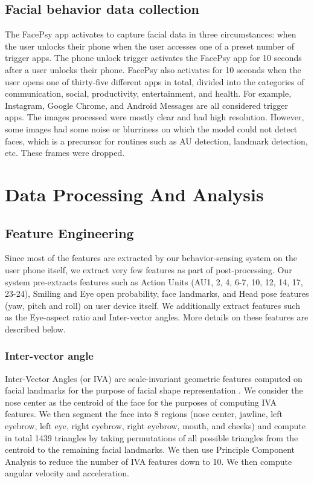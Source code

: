\subsection{Facial behavior data collection}
The FacePsy app activates to capture facial data in three circumstances: when the user unlocks their phone when the user accesses one of a preset number of trigger apps. The phone unlock trigger activates the FacePsy app for 10 seconds after a user unlocks their phone. FacePsy also activates for 10 seconds when the user opens one of thirty-five different apps in total, divided into the categories of communication, social, productivity, entertainment, and health. For example, Instagram, Google Chrome, and Android Messages are all considered trigger apps. The images processed were mostly clear and had high resolution. However, some images had some noise or blurriness on which the model could not detect faces, which is a precursor for routines such as AU detection, landmark detection, etc. These frames were dropped.


\section{Data Processing And Analysis}
\subsection{Feature Engineering} \label{Section-Feature-Extraction}
Since most of the features are extracted by our behavior-sensing system on the user phone itself, we extract very few features as part of post-processing. Our system pre-extracts features such as Action Units (AU1, 2, 4, 6-7, 10, 12, 14, 17, 23-24), Smiling and Eye open probability, face landmarks, and Head pose features (yaw, pitch and roll) on user device itself. We additionally extract features such as the Eye-aspect ratio and Inter-vector angles. More details on these features are described below. 

\subsubsection*{Inter-vector angle}
Inter-Vector Angles (or IVA) are scale-invariant geometric features computed on facial landmarks for the purpose of facial shape representation \cite{islam2016sention}. We consider the nose center as the centroid of the face for the purposes of computing IVA features. We then segment the face into 8 regions (nose center, jawline, left eyebrow, left eye, right eyebrow, right eyebrow, mouth, and cheeks) and compute in total 1439 triangles by taking permutations of all possible triangles from the centroid to the remaining facial landmarks. We then use Principle Component Analysis to reduce the number of IVA features down to 10. We then compute angular velocity and acceleration. 

